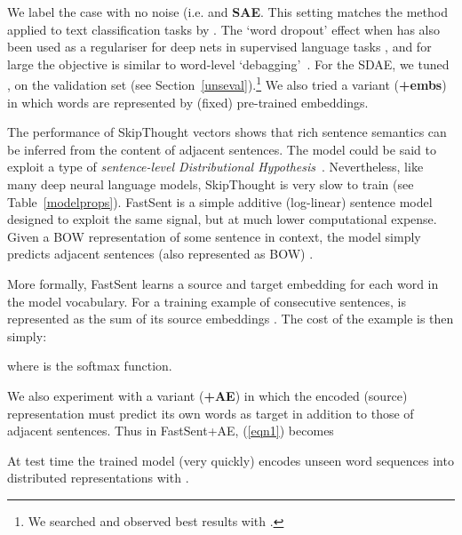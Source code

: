 \documentclass[11pt,letterpaper]{article}
\begin{document}
We label the case with no noise (i.e.  and  {\bf SAE}. This setting matches the method applied to text classification tasks by . The `word dropout' effect when  has also been used as a regulariser for deep nets in supervised language tasks \cite{iyyer2015deep}, and for large  the objective is similar to word-level `debagging'~\cite{sutskever2011generating}. For the SDAE, we tuned ,  on the validation set (see Section~\ref{unseval}).\footnote{We searched  and observed best results with .} We also tried a variant ({\bf +embs}) in which words are represented by (fixed) pre-trained embeddings. 

\vspace{5pt} The performance of SkipThought vectors shows that rich sentence semantics can be inferred from the content of adjacent sentences. The model could be said to exploit a type of \emph{sentence-level Distributional Hypothesis}~\cite{harris1954distributional,polajnar2015exploration}. Nevertheless, like many deep neural language models, SkipThought is very slow to train (see Table~\ref{modelprops}). FastSent is a simple additive (log-linear) sentence model designed to exploit the same signal, but at much lower computational expense. Given a BOW representation of some sentence in context, the model simply predicts adjacent sentences (also represented as BOW) .

More formally, FastSent learns a source  and target  embedding for each word in the model vocabulary. For a training example   of consecutive sentences,  is represented as the sum of its source embeddings . The cost of the example is then simply:

 where  is the softmax function.  

We also experiment with a variant ({\bf+AE}) in which the encoded (source) representation must predict its own words as target in addition to those of adjacent sentences. Thus in FastSent+AE, (\ref{eqn1}) becomes  

\noindent At test time the trained model (very quickly) encodes unseen word sequences into distributed representations with .
\end{document}
